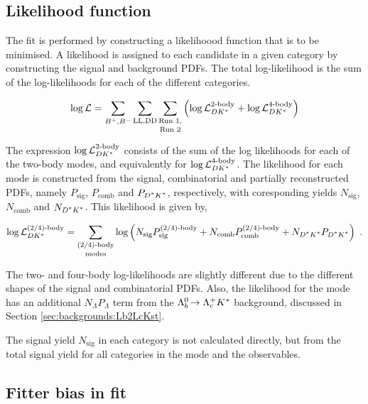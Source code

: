 \subsection{Likelihood function}
\label{sec:cpfit:likelihood}

The fit is performed by constructing a likelihoood function that is to be minimised. A likelihood is assigned to each candidate in a given category by constructing the signal and background PDFs. The total log-likelihood is the sum of the log-likelihoods for each of the different categories.

\begin{equation}
\log\mathcal{L} = \sum_{{{{B}^+}},{{{B}^-}}}\sum_{\text{LL,DD}}\mathop{\sum_{\text{Run 1,}}}_{\text{Run 2}} \left( \log\mathcal{L}_{{D}{{K}^*}}^{\text{2-body}} + \log\mathcal{L}_{{D}{{K}^*}}^{\text{4-body}} \right)
\end{equation}

The expression $\log\mathcal{L}_{{D}{{K}^*}}^{\text{2-body}}$ consists of the sum of the log likelihoods for each of the two-body modes, and equivalently for $\log\mathcal{L}_{{D}{{K}^*}}^{\text{4-body}}$. The likelihood for each mode is constructed from the signal, combinatorial and partially reconstructed PDFs, namely $P_{\text{sig}}$, $P_{\text{comb}}$ and $P_{\text{\Dstar\Kstar}}$, respectively, with coresponding yields $N_{\text{sig}}$, $N_{\text{comb}}$ and $N_{\text{\Dstar\Kstar}}$. This likelihood is given by,

\begin{equation}
\log\mathcal{L}_{\D\Kstar}^{\text{(2/4)-body}} = \mathop{\sum_{\text{(2/4)-body}}}_{\text{modes}} \log\left(N_{\text{sig}}P_{\text{sig}}^{\text{(2/4)-body}} + N_{\text{comb}}P_{\text{comb}}^{\text{(2/4)-body}} + N_{\text{\Dstar\Kstar}}P_{\text{\Dstar\Kstar}}\right) \text{ .}
\label{likelihood}
\end{equation}

The two- and four-body log-likelihoods are slightly different due to the different shapes of the signal and combinatorial PDFs. Also, the likelihood for  the \decay{\Dz}{\Kp\Km} mode has an additional $N_{\Lambda}P_{\Lambda}$ term from the ${{\Lambda}^0_{b}}\!\rightarrow {\ensuremath{{\Lambda}^+_{c}}}{\ensuremath{{K}^*}}$ background, discussed in Section \ref{sec:backgrounds:Lb2LcKst}.

The signal yield $N_{\text{sig}}$ in each category is not calculated directly, but from the total signal yield for all categories in the \decay{\Dz}{\Km\pip} mode and the \CP observables.

\subsection{Fitter bias in \CP fit}
\label{sec:cpfit:fitterbias}

